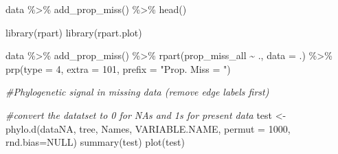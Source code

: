 \documentclass[
]{article}
\newenvironment{Shaded}{\begin{snugshade}}{\end{snugshade}}
\newcommand{\AttributeTok}[1]{\textcolor[rgb]{0.77,0.63,0.00}{#1}}
\newcommand{\CommentTok}[1]{\textcolor[rgb]{0.56,0.35,0.01}{\textit{#1}}}
\newcommand{\ConstantTok}[1]{\textcolor[rgb]{0.00,0.00,0.00}{#1}}
\newcommand{\DecValTok}[1]{\textcolor[rgb]{0.00,0.00,0.81}{#1}}
\newcommand{\FunctionTok}[1]{\textcolor[rgb]{0.00,0.00,0.00}{#1}}
\newcommand{\NormalTok}[1]{#1}
\newcommand{\OtherTok}[1]{\textcolor[rgb]{0.56,0.35,0.01}{#1}}
\newcommand{\SpecialCharTok}[1]{\textcolor[rgb]{0.00,0.00,0.00}{#1}}
\newcommand{\StringTok}[1]{\textcolor[rgb]{0.31,0.60,0.02}{#1}}
\begin{document}
\begin{Shaded}
\begin{Highlighting}[]
  
  
  
\NormalTok{  data }\SpecialCharTok{\%\textgreater{}\%}
  \FunctionTok{add\_prop\_miss}\NormalTok{() }\SpecialCharTok{\%\textgreater{}\%}
  \FunctionTok{head}\NormalTok{()}
  
\FunctionTok{library}\NormalTok{(rpart)}
\FunctionTok{library}\NormalTok{(rpart.plot)}
  
\NormalTok{  data }\SpecialCharTok{\%\textgreater{}\%}
  \FunctionTok{add\_prop\_miss}\NormalTok{() }\SpecialCharTok{\%\textgreater{}\%}
  \FunctionTok{rpart}\NormalTok{(prop\_miss\_all }\SpecialCharTok{\textasciitilde{}}\NormalTok{ ., }\AttributeTok{data =}\NormalTok{ .) }\SpecialCharTok{\%\textgreater{}\%}
  \FunctionTok{prp}\NormalTok{(}\AttributeTok{type =} \DecValTok{4}\NormalTok{, }\AttributeTok{extra =} \DecValTok{101}\NormalTok{, }\AttributeTok{prefix =} \StringTok{"Prop. Miss = "}\NormalTok{)}
  
  
\CommentTok{\#Phylogenetic signal in missing data (remove edge labels first)}
  
\CommentTok{\#convert the datatset to 0 for NAs and 1s for present data  }
\NormalTok{test }\OtherTok{\textless{}{-}} \FunctionTok{phylo.d}\NormalTok{(dataNA, tree, Names, VARIABLE.NAME, }\AttributeTok{permut =} \DecValTok{1000}\NormalTok{, }\AttributeTok{rnd.bias=}\ConstantTok{NULL}\NormalTok{)}
\FunctionTok{summary}\NormalTok{(test)}
\FunctionTok{plot}\NormalTok{(test)}
\end{Highlighting}
\end{Shaded}
\end{document}
